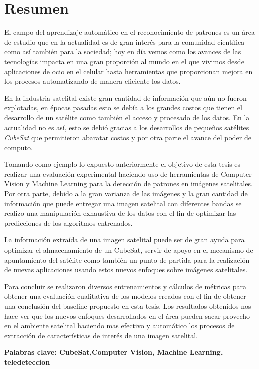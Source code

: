 \chapter*{Resumen}
\label{chap:resumen}

El campo del aprendizaje automático en el reconocimiento de patrones es un área de estudio que en la actualidad es de gran interés para la comunidad científica como así también para la sociedad; hoy en día vemos como los avances de las tecnologías impacta en una gran proporción al mundo en el que vivimos desde aplicaciones de ocio en el celular hasta herramientas que proporcionan mejora en los procesos automatizando de manera eficiente los datos.

En la industria satelital existe gran cantidad de información que aún no fueron explotadas, en épocas pasadas esto se debía a los grandes costos que tienen el desarrollo de un satélite como también el acceso y procesado de los datos. En la actualidad no es así, esto se debió gracias a los desarrollos de pequeños satélites \textit{CubeSat} que permitieron abaratar costos y por otra parte el avance del poder de computo.

Tomando como ejemplo lo expuesto anteriormente el objetivo de esta tesis es realizar una evaluación experimental haciendo uso  de herramientas de Computer Vision y Machine Learning para la detección de patrones en imágenes satelitales. 
Por otra parte, debido a la gran varianza de las imágenes y la gran cantidad de información que puede entregar una imagen satelital con diferentes bandas se realizo una manipulación exhaustiva de los datos con el fin de optimizar las predicciones de los algoritmos entrenados. 

La información extraída de una imagen satelital puede ser de gran ayuda para optimizar el almacenamiento de un CubeSat, servir de apoyo en el mecanismo de apuntamiento del satélite como también un punto de partida para la realización de nuevas aplicaciones usando estos nuevos enfoques sobre imágenes satelitales.

Para concluir se realizaron diversos entrenamientos y cálculos de métricas para obtener una evaluación cualitativa de los modelos creados con el fin de obtener una conclusión del baseline propuesto en esta tesis. Los resultados obtenidos nos hace ver que los nuevos enfoques desarrollados en el área pueden sacar provecho en el ambiente satelital haciendo mas efectivo y automático los procesos de extracción de características de interés de una imagen satelital.


\textbf{Palabras clave: CubeSat,Computer Vision, Machine Learning, teledeteccion}

